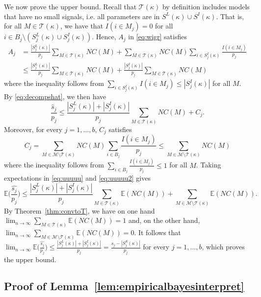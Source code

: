 \documentclass[
  12pt]{article}
\newcommand{\E}{\mathbb{E}}
\newcommand{\M}{\mathcal{M}}
\newcommand{\T}{\mathcal{T}}
\begin{document}
We now prove the upper bound. Recall that $\T(\kappa)$ by definition includes models that have no small signals, i.e. all parameters are in $S^L(\kappa) \cup S^I(\kappa)$. That is,
for all $M\in\T(\kappa)$, we have that $I(i\in M_j)=0$ for all $i\in B_j\setminus(S^{L}_j(\kappa)\cup S^{I}_j(\kappa))$. Hence, $A_j$ in \eqref{eq:wigr} satisfies
\begin{align*}
    A_j
   &= \frac{|S^{L}_j(\kappa)|}{p_j}\sum_{M \in \T(\kappa)}NC(M)+\sum_{M \in \T(\kappa)}NC(M)\sum_{i \in S^{I}_j(\kappa)}\frac{I(i\in M_j)}{p_j}\\
   &\leq\frac{|S^{L}_j(\kappa)|}{p_j}\sum_{M \in \T(\kappa)}NC(M)+ \frac{|S^{I}_j(\kappa)|}{p_j}\sum_{M \in \T(\kappa)}NC(M)
\end{align*}
where the inequality follows from $\sum_{i \in S^{I}_j(\kappa)} I(i\in M_j) \leq |S_j^{I}(\kappa)|$  for all $M$. By \eqref{eq:decompshat}, we then have
\begin{equation}\label{eq:uuuuu}
    \frac{\hat{s}_j}{p_j}\leq \frac{|S^{L}_j(\kappa)|+|S^{I}_j(\kappa)|}{p_j}\sum_{M \in \T(\kappa)}NC(M) + C_j.
\end{equation}
Moreover, for every $j=1,\ldots,b$, $C_j$ satisfies
\begin{equation}\label{eq:uuuuu2}
    C_j = \sum_{M \in \M\setminus \T(\kappa)}NC(M)\sum_{i \in B_j}\frac{I(i\in M_j)}{p_j}\leq \sum_{M \in \M\setminus \T(\kappa)}NC(M)
\end{equation}
where the inequality follows from $\sum_{i \in B_j}\frac{I(i\in M_j)}{p_j}\leq 1$ for all $M$.
Taking expectations in \eqref{eq:uuuuu} and \eqref{eq:uuuuu2} gives
\begin{equation*}
    \E\bigg(\frac{\widehat{s_j}}{p_j}\bigg) 
    \leq \frac{|S^{L}_j(\kappa)|+|S^{I}_j(\kappa)|}{p_j}\sum_{M \in \T(\kappa)}\E(NC(M)) + \sum_{M \in \M\setminus \T(\kappa)}\E(NC(M)).
\end{equation*}
 By Theorem~\ref{thm:convtoT}, we have on one hand $\lim_{n\to \infty}\sum_{M \in \T(\kappa)}\E(NC(M))= 1$ and, on the other hand, $\lim_{n\to \infty}\sum_{M \in \M\setminus\T(\kappa)}\E(NC(M))= 0$. It follows that $ \lim_{n\to \infty}\E\big(\frac{\widehat{s_j}}{p_j}\big) \leq  \frac{|S^{L}_j(\kappa)|+|S^{I}_j(\kappa)|}{p_j}= \frac{s_j-|S^{S}_j(\kappa)|}{p_j}$ for every $j=1,\ldots,b$, which proves the upper bound.

 \subsection{Proof of Lemma~\ref{lem:empiricalbayesinterpret}}
\end{document}
